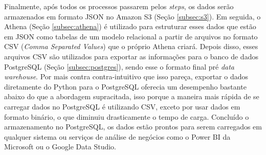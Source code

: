 Finalmente, após todos os processos passarem pelos \textit{steps}, os dados serão armazenados em formato JSON no Amazon S3 (Seção \ref{subsec:s3}). Em seguida, o Athena (Seção \ref{subsec:athena}) é utilizado para estruturar esses dados que estão em JSON como tabelas de um modelo relacional a partir de arquivos no formato CSV (\textit{Comma Separated Values}) que o próprio Athena criará. Depois disso, esses arquivos CSV são utilizados para exportar as informações para o banco de dados PostgreSQL (Seção \ref{subsec:postgres}), sendo esse o formato final pré \textit{data warehouse}. Por mais contra contra-intuitivo que isso pareça, exportar o dados diretamente do Python para o PostgreSQL oferecia um desempenho bastante abaixo do que a abordagem supracitada, isso porque a maneira mais rápida de se carregar dados no PostgreSQL é utilizando CSV, exceto por usar dados em formato binário, o que diminuiu drasticamente o tempo de carga. Concluído o armazenamento no PostgreSQL, os dados estão prontos para serem carregados em qualquer sistema ou serviços de análise de negócios como o Power BI da Microsoft ou o Google Data Studio.